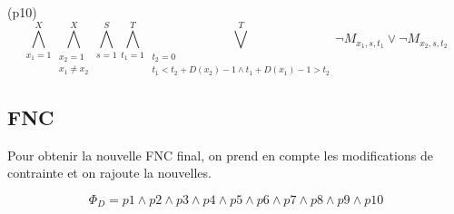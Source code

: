 \documentclass[a4paper,11pt]{article}
\begin{document}
(p10)
\begin{displaymath}
\bigwedge\limits_{x_{1}=1}^{X}\bigwedge\limits_{\substack{x_{2}=1 \\ x_{1} \neq x_{2}}}^{X}\bigwedge\limits_{s=1}^{S}\bigwedge\limits_{t_{1}=1}^{T}\bigvee\limits_{\substack{t_{2}=0 \\ t_{1} < t_{2} + D(x_{2})-1 \wedge t_{1} + D(x_{1})-1 > t_{2}}}^{T} \neg M_{x_{1}, s, t_{1}} \vee \neg M_{x_{2}, s, t_{2}}
\end{displaymath}

\subsection{FNC}
Pour obtenir la nouvelle FNC final, on prend en compte les modifications de contrainte et on rajoute la nouvelles.

\begin{displaymath}
	\Phi_{D} = p1 \wedge p2 \wedge p3 \wedge p4 \wedge p5 \wedge p6 \wedge p7 \wedge p8 \wedge p9 \wedge p10
\end{displaymath}
\end{document}
